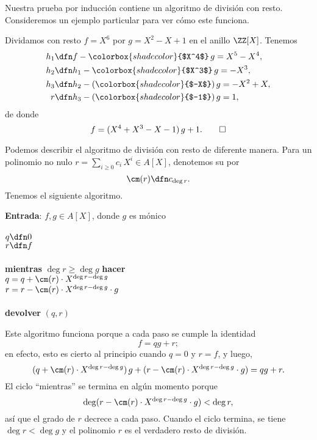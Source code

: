 Nuestra prueba por inducción contiene un algoritmo de división con
resto. Consideremos un ejemplo particular para ver cómo este funciona.

\begin{ejemplo}
  Dividamos con resto $f = X^6$ por $g = X^2 - X + 1$ en el anillo
  $\ZZ [X]$. Tenemos
  \begin{align*}
    h_1 & \dfn f - \colorbox{shadecolor}{$X^4$}\,g = X^5 - X^4,\\
    h_2 & \dfn h_1 - \colorbox{shadecolor}{$X^3$}\,g = -X^3,\\
    h_3 & \dfn h_2 - (\colorbox{shadecolor}{$-X$})\,g = -X^2 + X,\\
    r & \dfn h_3 - (\colorbox{shadecolor}{$-1$})\,g = 1,
  \end{align*}
  de donde
  \[ f = (X^4 + X^3 - X - 1)\,g + 1. \qedhere \]
\end{ejemplo}

\begin{comentarioast}
  Podemos describir el algoritmo de división con resto de diferente manera. Para
  un polinomio no nulo $r = \sum_{i\ge 0} c_i\,X^i \in A [X]$, denotemos su
   por
  $$\cm (r) \dfn c_{\deg r}.$$
  Tenemos el siguiente algoritmo.

  \begin{framed}
    \noindent \textbf{Entrada}: $f,g \in A [X]$, donde $g$ es mónico\\
    \\
    $q \dfn 0$\\
    $r \dfn f$\\
    \\
    \textbf{mientras} $\deg r \ge \deg g$ \textbf{hacer}\\
    \hspace*{3ex} $q = q + \cm (r)\cdot X^{\deg r - \deg g}$\\
    \hspace*{3ex} $r = r - \cm (r)\cdot X^{\deg r - \deg g}\cdot g$\\
    \\
    \textbf{devolver} $(q,r)$
  \end{framed}

  Este algoritmo funciona porque a cada paso se cumple la identidad
  $$f = qg + r;$$
  en efecto, esto es cierto al principio cuando $q = 0$ y $r = f$, y luego,
  $$(q + \cm (r)\cdot X^{\deg r - \deg g})\,g + (r - \cm (r)\cdot X^{\deg r - \deg g}\cdot g) = qg+r.$$
  El ciclo ``mientras'' se termina en algún momento porque
  $$\deg (r - \cm (r)\cdot X^{\deg r - \deg g}\cdot g) < \deg r,$$
  así que el grado de $r$ decrece a cada paso. Cuando el ciclo termina, se tiene
  $\deg r < \deg g$ y el polinomio $r$ es el verdadero resto de división.
\end{comentarioast}

